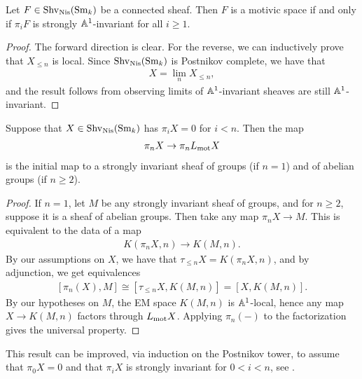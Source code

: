 \documentclass[11pt,openany]{book}
\begin{document}
\begin{corollary}\cite[1.11]{bachmannstrongly}
Let $F \in \mathrm{Shv}_{\mathrm{Nis}}(\mathrm{Sm}_k)$ be a connected sheaf. Then $F$ is a motivic space if and only if $\pi_i F$ is strongly $\mathbb{A}^1$-invariant for all $i\ge 1$.
\end{corollary}
\begin{proof} The forward direction is clear. For the reverse, we can inductively prove that $X_{\le n}$ is local. Since $\mathrm{Shv}_{\mathrm{Nis}}(\mathrm{Sm}_k)$ is Postnikov complete, we have that
\begin{align*}
    X = \lim_n X_{\le n},
\end{align*}
and the result follows from observing limits of $\mathbb{A}^1$-invariant sheaves are still $\mathbb{A}^1$-invariant.
\end{proof}


\begin{proposition} Suppose that $X\in \mathrm{Shv}_{\mathrm{Nis}}(\mathrm{Sm}_k)$ has $\pi_i X = 0$ for $i<n$. Then the map
\begin{align*}
    \pi_n X \to \pi_n L_{\mathrm{mot}} X
\end{align*}
is the initial map to a strongly invariant sheaf of groups (if $n=1$) and of abelian groups (if $n\ge2$).
\end{proposition}
\begin{proof} If $n=1$, let $M$ be any strongly invariant sheaf of groups, and for $n\ge2$, suppose it is a sheaf of abelian groups. Then take any map $\pi_n X \to M$. This is equivalent to the data of a map
\begin{align*}
    K(\pi_n X,n) \to K(M,n).
\end{align*}
By our assumptions on $X$, we have that $\tau_{\le n}X = K(\pi_n X, n)$, and by adjunction, we get equivalences
\begin{align*}
    \left[ \pi_n(X),M \right] \cong \left[ \tau_{\le n}X, K(M,n) \right] = \left[ X, K(M,n) \right].
\end{align*}
By our hypotheses on $M$, the EM space $K(M,n)$ is $\mathbb{A}^1$-local, hence any map $X \to K(M,n)$ factors through $L_{\mathrm{mot}} X$. Applying $\pi_n(-)$ to the factorization gives the universal property.
\end{proof}

\begin{remark} This result can be improved, via induction on the Postnikov tower, to assume that $\pi_0 X = 0$ and that $\pi_i X$ is strongly invariant for $0 < i < n$, see \cite[6.60]{Morel}.
\end{remark}
\end{document}

